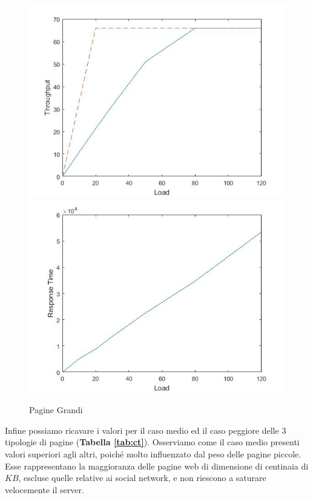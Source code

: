 		\begin{figure}[H]
			\centering
			\includegraphics[scale=0.6]{./immagine/grandeT.jpg}
			\includegraphics[scale=0.6]{./immagine/grandeR.jpg}
			\caption{Pagine Grandi}
			\label{fig:ct-g}
		\end{figure}
	
		Infine possiamo ricavare i valori per il caso medio ed il caso peggiore delle 3 tipologie di pagine (\textbf{Tabella \ref{tab:ct}}). Osserviamo come il caso medio presenti valori superiori agli altri, poiché molto influenzato dal peso delle pagine piccole. Esse rappresentano la maggioranza delle pagine web di dimensione di centinaia di $KB$, escluse quelle relative ai social network, e non riescono a saturare velocemente il server.
		
